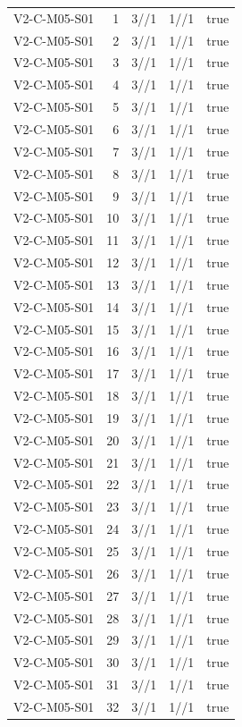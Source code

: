 {\begin{longtable}{lrrrr}
V2-C-M05-S01 & 1 & 3//1 & 1//1 & true \\
V2-C-M05-S01 & 2 & 3//1 & 1//1 & true \\
V2-C-M05-S01 & 3 & 3//1 & 1//1 & true \\
V2-C-M05-S01 & 4 & 3//1 & 1//1 & true \\
V2-C-M05-S01 & 5 & 3//1 & 1//1 & true \\
V2-C-M05-S01 & 6 & 3//1 & 1//1 & true \\
V2-C-M05-S01 & 7 & 3//1 & 1//1 & true \\
V2-C-M05-S01 & 8 & 3//1 & 1//1 & true \\
V2-C-M05-S01 & 9 & 3//1 & 1//1 & true \\
V2-C-M05-S01 & 10 & 3//1 & 1//1 & true \\
V2-C-M05-S01 & 11 & 3//1 & 1//1 & true \\
V2-C-M05-S01 & 12 & 3//1 & 1//1 & true \\
V2-C-M05-S01 & 13 & 3//1 & 1//1 & true \\
V2-C-M05-S01 & 14 & 3//1 & 1//1 & true \\
V2-C-M05-S01 & 15 & 3//1 & 1//1 & true \\
V2-C-M05-S01 & 16 & 3//1 & 1//1 & true \\
V2-C-M05-S01 & 17 & 3//1 & 1//1 & true \\
V2-C-M05-S01 & 18 & 3//1 & 1//1 & true \\
V2-C-M05-S01 & 19 & 3//1 & 1//1 & true \\
V2-C-M05-S01 & 20 & 3//1 & 1//1 & true \\
V2-C-M05-S01 & 21 & 3//1 & 1//1 & true \\
V2-C-M05-S01 & 22 & 3//1 & 1//1 & true \\
V2-C-M05-S01 & 23 & 3//1 & 1//1 & true \\
V2-C-M05-S01 & 24 & 3//1 & 1//1 & true \\
V2-C-M05-S01 & 25 & 3//1 & 1//1 & true \\
V2-C-M05-S01 & 26 & 3//1 & 1//1 & true \\
V2-C-M05-S01 & 27 & 3//1 & 1//1 & true \\
V2-C-M05-S01 & 28 & 3//1 & 1//1 & true \\
V2-C-M05-S01 & 29 & 3//1 & 1//1 & true \\
V2-C-M05-S01 & 30 & 3//1 & 1//1 & true \\
V2-C-M05-S01 & 31 & 3//1 & 1//1 & true \\
V2-C-M05-S01 & 32 & 3//1 & 1//1 & true \\

\end{longtable}}
